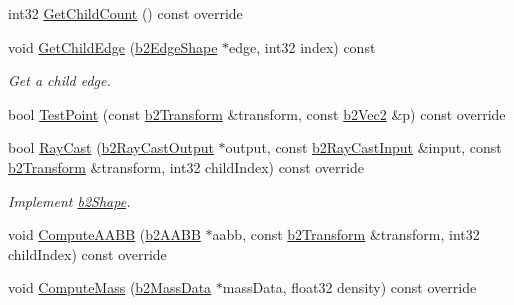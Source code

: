 \begin{DoxyCompactItemize}
int32 \hyperlink{classb2_chain_shape_a4d4fd8f5386a30f35b10d1b2848dbe54}{Get\+Child\+Count} () const override
\item 
\mbox{\label{classb2_chain_shape_abfe7f836d3c32dc06b920df61a74f412}} 
void \hyperlink{classb2_chain_shape_abfe7f836d3c32dc06b920df61a74f412}{Get\+Child\+Edge} (\hyperlink{classb2_edge_shape}{b2\+Edge\+Shape} $\ast$edge, int32 index) const
\begin{DoxyCompactList}\small\item\em Get a child edge. \end{DoxyCompactList}\item 
bool \hyperlink{classb2_chain_shape_afd03c8679f18f9962a6c76bde629c62a}{Test\+Point} (const \hyperlink{structb2_transform}{b2\+Transform} \&transform, const \hyperlink{structb2_vec2}{b2\+Vec2} \&p) const override
\item 
\mbox{\label{classb2_chain_shape_add9e88f7f90b32ae75738cfb042ef532}} 
bool \hyperlink{classb2_chain_shape_add9e88f7f90b32ae75738cfb042ef532}{Ray\+Cast} (\hyperlink{structb2_ray_cast_output}{b2\+Ray\+Cast\+Output} $\ast$output, const \hyperlink{structb2_ray_cast_input}{b2\+Ray\+Cast\+Input} \&input, const \hyperlink{structb2_transform}{b2\+Transform} \&transform, int32 child\+Index) const override
\begin{DoxyCompactList}\small\item\em Implement \hyperlink{classb2_shape}{b2\+Shape}. \end{DoxyCompactList}\item 
void \hyperlink{classb2_chain_shape_ae1d7470ce8d32e92d27c149ab45f5468}{Compute\+A\+A\+BB} (\hyperlink{structb2_a_a_b_b}{b2\+A\+A\+BB} $\ast$aabb, const \hyperlink{structb2_transform}{b2\+Transform} \&transform, int32 child\+Index) const override
\item 
void \hyperlink{classb2_chain_shape_aad3671d6eab61f6b26e2f1b6ac50bb98}{Compute\+Mass} (\hyperlink{structb2_mass_data}{b2\+Mass\+Data} $\ast$mass\+Data, float32 density) const override
\end{DoxyCompactItemize}
